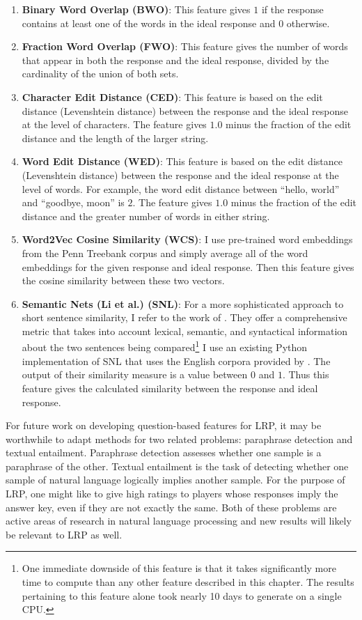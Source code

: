 \begin{enumerate}
\item \textbf{Binary Word Overlap (BWO)}: This feature gives $1$ if the response contains at least one of the words in the ideal response and $0$ otherwise.
\item \textbf{Fraction Word Overlap (FWO)}: This feature gives the number of words that appear in both the response and the ideal response, divided by the cardinality of the union of both sets.
\item \textbf{Character Edit Distance (CED)}: This feature is based on the edit distance (Levenshtein distance) between the response and the ideal response at the level of characters. The feature gives $1.0$ minus the fraction of the edit distance and the length of the larger string.
\item \textbf{Word Edit Distance (WED)}:  This feature is based on the edit distance (Levenshtein distance) between the response and the ideal response at the level of words. For example, the word edit distance between ``hello, world'' and ``goodbye, moon'' is $2$. The feature gives $1.0$ minus the fraction of the edit distance and the greater number of words in either string.
\item \textbf{Word2Vec Cosine Similarity (WCS)}: I use pre-trained word embeddings from the Penn Treebank corpus and simply average all of the word embeddings for the given response and ideal response. Then this feature gives the cosine similarity between these two vectors.
\item \textbf{Semantic Nets (Li et al.) (SNL)}: For a more sophisticated approach to short sentence similarity, I refer to the work of \citet{li2006sentence}. They offer a comprehensive metric that takes into account lexical, semantic, and syntactical information about the two sentences being compared\footnote{One immediate downside of this feature is that it takes significantly more time to compute than any other feature described in this chapter. The results pertaining to this feature alone took nearly 10 days to generate on a single CPU.} I use an existing Python implementation of SNL that uses the English corpora provided by \citet{bird2009natural}. The output of their similarity measure is a value between $0$ and $1$. Thus this feature gives the calculated similarity between the response and ideal response.
\end{enumerate}

For future work on developing question-based features for LRP, it may be worthwhile to adapt methods for two related problems: paraphrase detection and textual entailment. Paraphrase detection assesses whether one sample is a paraphrase of the other. Textual entailment is the task of detecting whether one sample of natural language logically implies another sample. For the purpose of LRP, one might like to give high ratings to players whose responses imply the answer key, even if they are not exactly the same. Both of these problems are active areas of research in natural language processing and new results will likely be relevant to LRP as well.

